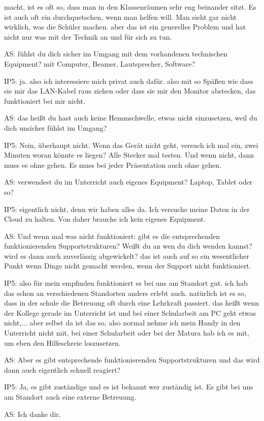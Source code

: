 \documentclass[fontsize=11pt,paper=a4]{scrbook}
\begin{document}
{\begin{itemize*}
macht, ist es oft so, dass man in den
Klassenräumen sehr eng beinander sitzt. Es ist auch oft ein durchquetschen, wenn man helfen will. Man sieht gar nicht wirklich, was die Schüler machen. aber das ist ein
generelles Problem und  hat nicht nur was mit der
Technik an und für sich zu tun.
\item[AS:]
fühlst du dich sicher im Umgang mit dem
vorhandenen technischen Equipment? mit Computer, Beamer, Lautsprecher, Software?
\item[IP5:] ja. 
also ich interessiere mich privat auch
dafür. also mit so Späßen wie dass sie mir das LAN-Kabel raus ziehen oder dass sie mir den Monitor abstecken, das funktioniert bei mir nicht.
\item[AS:] das
heißt du hast auch keine Hemmschwelle, etwas nicht einzusetzen, weil du dich unsicher fühlst im Umgang?
\item[IP5:] Nein, überhaupt nicht. Wenn das Gerät nicht geht, versuch ich mal ein, zwei Minuten woran könnte es liegen? Alle Stecker mal testen. Und wenn nicht, dann muss es ohne gehen. Es muss bei jeder Präsentation auch ohne
gehen.
\item[AS:] verwendest du im Unterricht auch eigenes Equipment? Laptop, Tablet oder so?
\item[IP5:] eigentlich nicht, denn wir haben alles da. Ich versuche meine Daten in der
Cloud zu halten. Von daher brauche ich kein eigenes
Equipment.
\item[AS:] Und wenn mal was nicht
funktioniert: gibt es die entsprechenden
funktionierenden Supportstrukturen? Weißt du an wen du dich wenden kannst? wird es dann
auch zuverlässig abgewickelt?
das ist auch auf so ein wesentlicher
Punkt wenn Dinge nicht gemacht werden, 
wenn der Support nicht
funktioniert.
\item[IP5:] also für mein empfinden funktioniert es bei uns am Standort gut. 
ich hab das schon an verschiedenen
Standorten anders erlebt auch. natürlich
ist es so, dass in der schule die
Betreuung oft durch eine Lehrkraft
passiert. das heißt wenn der Kollege
gerade im Unterricht ist und bei einer
Schularbeit am PC geht etwas nicht,...
aber selbst da ist das so, also normal  nehme
ich mein Handy in den Unterricht nicht mit, bei einer Schularbeit oder bei der Matura hab ich es mit, um  eben den Hilfeschreie loszusetzen. 
\item[AS:] Aber es gibt
entsprechende funktionierenden
Supportstrukturen und das wird dann auch
eigentlich schnell reagiert?
\item[IP5:] Ja, es gibt zuständige und es ist bekannt wer zuständig ist. Es gibt bei uns am Standort auch eine externe Betreuung.
\item[AS:] Ich danke dir.
\end{itemize*} 
}
\end{document}
